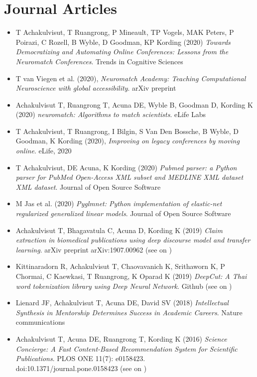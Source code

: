 \section{\sc Journal Articles}

\begin{itemize}[leftmargin=0cm, label={}]

\item T Achakulvisut, T Ruangrong, P Mineault, TP Vogels, MAK Peters, P Poirazi, C Rozell, B Wyble, D Goodman, KP Kording (2020) {\em Towards Democratizing and Automating Online Conferences: Lessons from the Neuromatch Conferences}. Trends in Cognitive Sciences

\item T van Viegen et al. (2020), {\em Neuromatch Academy: Teaching Computational Neuroscience with global accessibility}. arXiv preprint

\item Achakulvisut T, Ruangrong T, Acuna DE, Wyble B,  Goodman D, Kording K (2020) {\em neuromatch: Algorithms to match scientists}. eLife Labs

\item T Achakulvisut, T Ruangrong, I Bilgin, S Van Den Bossche, B Wyble, D Goodman, K Kording (2020), {\em Improving on legacy conferences by moving online}. eLife, 2020

\item T Achakulvisut, DE Acuna, K Kording (2020) {\em Pubmed parser: a Python parser for PubMed Open-Access XML subset and MEDLINE XML dataset XML dataset}. Journal of Open Source Software

\item M Jas et al. (2020) {\em Pyglmnet: Python implementation of elastic-net regularized generalized linear models}. Journal of Open Source Software

\item Achakulvisut T, Bhagavatula C, Acuna D, Kording K (2019) {\em Claim extraction in biomedical publications using deep discourse model and transfer learning}. arXiv preprint arXiv:1907.00962 (see on \href{https://github.com/titipata/detecting-scientific-claim}{\faGithubAlt})

\item Kittinaradorn R, Achakulvisut T, Chaovavanich K, Srithaworn K, P Chormai, C Kaewkasi, T Ruangrong, K Oparad K (2019) {\em  DeepCut: A Thai word tokenization library using Deep Neural Network}. Github (see on \href{https://github.com/rkcosmos/deepcut}{\faGithubAlt})

\item Lienard JF, Achakulvisut T, Acuna DE, David SV (2018) {\em Intellectual Synthesis in Mentorship Determines Success in Academic Careers}. Nature communications

\item Achakulvisut T, Acuna DE, Ruangrong T, Kording K (2016) {\em Science Concierge: A Fast Content-Based Recommendation System for Scientific Publications}. PLOS ONE 11(7): e0158423.\\ doi:10.1371/journal.pone.0158423 
(see on \href{https://github.com/titipata/science_concierge}{\faGithubAlt})


\end{itemize}
